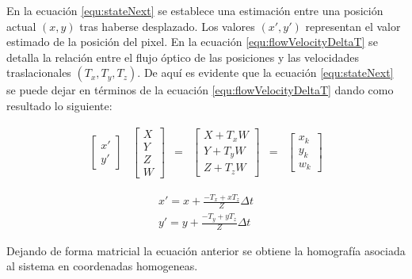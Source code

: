 En la ecuación \ref{equ:stateNext} se establece una estimación entre una posición actual $(x,y)$ tras haberse desplazado. Los valores $(x',y')$ representan el valor estimado de la posición del pixel. En la ecuación \ref{equ:flowVelocityDeltaT} se detalla la relación entre el flujo óptico de las posiciones y las velocidades traslacionales $(T_x,T_y,T_z)$. De aquí es evidente que la ecuación \ref{equ:stateNext} se puede dejar en términos de la ecuación \ref{equ:flowVelocityDeltaT} dando como resultado lo siguiente:


\begin{equation}
    \label{equ:homografiaDesarrollo}
    \begin{aligned}
        \left[\begin{array}{c}
        x'\\
        y' 
    \end{array}\right]&\left[\begin{array}{c}
         X\\
         Y\\
         Z\\
         W
    \end{array}\right]&=&\left[\begin{array}{c}
    X+T_xW\\
    Y+T_yW\\
    Z+T_zW
    \end{array}\right]&=&\left[\begin{array}{c}
         x_k\\
         y_k\\
         w_k
    \end{array}\right]
    \end{aligned}
\end{equation}


\begin{equation}
    \label{equ:homografiaNoHomogen}
    \begin{aligned}
         x'= x+\frac{-T_x + xT_z}{Z}\Delta t\\
         y'= y+\frac{-T_y + yT_z}{Z}\Delta t
    \end{aligned}
\end{equation}

Dejando de forma matricial la ecuación anterior se obtiene la homografía asociada al sistema en coordenadas homogeneas.


